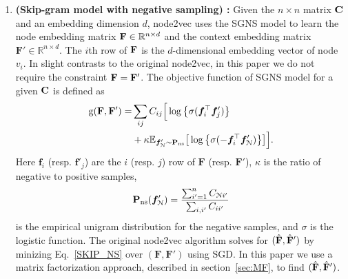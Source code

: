 \documentclass[10pt,journal,compsoc]{IEEEtran}
\newcommand{\ee}{\end{aligned} \end{equation}}
\newcommand{\tp}{^\top}
\newcommand{\bee}{\begin{equation}\begin{aligned}}
\newcommand{\M}[1]{{{\mathbf{\MakeUppercase{#1}}}}}
\numberwithin{equation}{section}
\begin{document}
\begin{enumerate}
\item {\bf (Skip-gram model with negative sampling) :}
Given the $n \times n$ matrix $\M C$ and an embedding dimension $d$,
node2vec uses the SGNS model to learn the node embedding matrix $\M F
\in \mathbb{R}^{n \times d}$ and the context embedding matrix
$\mathbf{F}' \in \mathbb{R}^{n \times d}$. The $i$th row of $\M F$ is
the $d$-dimensional embedding vector of node $v_i$.
In slight contrasts to the original node2vec, in this paper we do not
require the constraint $\M F = \M F'$. The objective function of SGNS
model for a given $\M C$ is defined as
\bee\label{SKIP_NS} \mathrm{g}(\M F,\M F') =& \sum_{ij}
C_{ij}\Big[\log\big\{\sigma( {\boldsymbol f}_i\tp 
{\boldsymbol f}'_{j})\big\} 
\\
&+ \kappa \mathbb{E}_{{\boldsymbol
f}'_\mathcal{N} \sim \M P_{\text{ns}}}\big[\log\big\{\sigma(-{\boldsymbol
f}_i\tp {\boldsymbol f}'_\mathcal{N})\big\}\big]\Big].\ee
Here $\bm{f}_i$ (resp. $\bm{f}'_{j}$) are the $i$ (resp. $j$) row of $\mathbf{F}$ (resp. $\mathbf{F}'$), $\kappa$ is the ratio of negative to positive samples,
$$\M P_{\text{ns}}({\boldsymbol f}'_\mathcal{N}) = \frac{\sum_{i' = 1}^n
C_{\mathcal{N}i'}}{\sum_{i,i'} C_{ii'}}$$ is the empirical unigram
distribution for the negative samples, and $\sigma$ is the logistic function. The original node2vec algorithm solves
for $(\hat{\M F}, \hat{\M F}')$ by minizing Eq.~\eqref{SKIP_NS}  over 
$(\mathbf{F}, \mathbf{F'})$ using SGD. In
this paper we use a matrix
factorization approach, described in section~\ref{sec:MF}, to find $(\hat{\M F}, \hat{\M F}')$. 
\end{enumerate}
\end{document}
